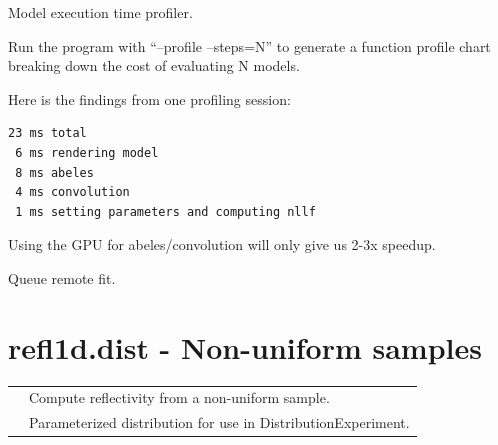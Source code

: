 \documentclass[letterpaper,10pt,english]{sphinxmanual}
\begin{document}
\begin{fulllineitems}
\label{api/cli:refl1d.cli.run_profile}
Model execution time profiler.

Run the program with ``--profile --steps=N'' to generate a function
profile chart breaking down the cost of evaluating N models.

Here is the findings from one profiling session:

\begin{Verbatim}[commandchars=@\[\]]
23 ms total
 6 ms rendering model
 8 ms abeles
 4 ms convolution
 1 ms setting parameters and computing nllf
\end{Verbatim}

Using the GPU for abeles/convolution will only give us 2-3x speedup.

\end{fulllineitems}


\begin{fulllineitems}
\label{api/cli:refl1d.cli.start_remote_fit}
Queue remote fit.

\end{fulllineitems}


\begin{fulllineitems}
\label{api/cli:refl1d.cli.store_overwrite_query}
\end{fulllineitems}


\begin{fulllineitems}
\label{api/cli:refl1d.cli.store_overwrite_query_gui}
\end{fulllineitems}



\section{refl1d.dist - Non-uniform samples}
\label{api/dist::doc}\label{api/dist:refl1d-dist-non-uniform-samples}
\begin{tabulary}{\linewidth}{LL}
\hline

{\hyperref[api/dist:refl1d.dist.DistributionExperiment]{}}
 & 
Compute reflectivity from a non-uniform sample.
\\

{\hyperref[api/dist:refl1d.dist.Weights]{}}
 & 
Parameterized distribution for use in DistributionExperiment.
\\
\hline
\end{tabulary}
\end{document}
